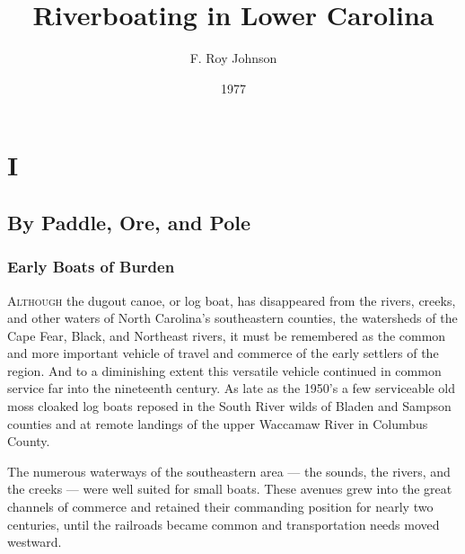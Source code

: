 \documentclass[11pt, a5paper, openright]{book}
\begin{document}
\renewcommand{\thechapter}{\Roman{chapter}}
\title{Riverboating in Lower Carolina}
\author{F. Roy Johnson}
\date{1977}

\maketitle


\tableofcontents

\part{I}

\chapter{By Paddle, Ore, and Pole}

\section{Early Boats of Burden}

\textsc{Although} the dugout canoe, or log boat, has disappeared from
the rivers, creeks, and other waters of North Carolina's southeastern
counties, the watersheds of the Cape Fear, Black, and Northeast
rivers, it must be remembered as the common and more important vehicle
of travel and commerce of the early settlers of the region.  And to a
diminishing extent this versatile vehicle continued in common service
far into the nineteenth century.  As late as the 1950's a few
serviceable old moss cloaked log boats reposed in the South River
wilds of Bladen and Sampson counties and at remote landings of the
upper Waccamaw River in Columbus County.\par

The numerous waterways of the southeastern area --- the sounds, the
rivers, and the creeks --- were well suited for small boats.  These
avenues grew into the great channels of commerce and retained their
commanding position for nearly two centuries, until the railroads
became common and transportation needs moved westward.\par
\end{document}

